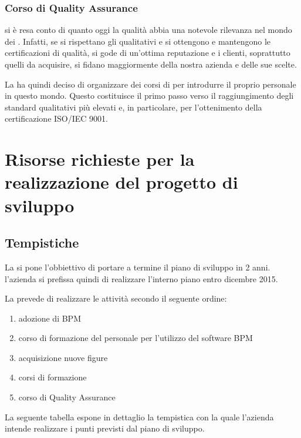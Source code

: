 
\subsubsection{Corso di Quality Assurance}
\customer si è resa conto di quanto oggi la qualità abbia una notevole rilevanza nel mondo dei . Infatti, se si rispettano gli  qualitativi e si ottengono e mantengono le certificazioni di qualità, si gode di un'ottima reputazione e i clienti, soprattutto quelli da acquisire, si fidano maggiormente della nostra azienda e delle sue scelte.

La \customer ha quindi deciso di organizzare dei corsi di  per introdurre il proprio personale in questo mondo. Questo costituisce il primo passo verso il raggiungimento degli standard qualitativi più elevati e, in particolare,  per l'ottenimento della certificazione ISO/IEC 9001.
  
  
  
  
\section{Risorse richieste per la realizzazione del progetto di sviluppo}
\subsection{Tempistiche}
La \customer si pone l'obbiettivo di portare a termine il piano di sviluppo in 2 anni. l'azienda si prefissa quindi di realizzare l'interno piano entro dicembre 2015.       
	
La \customer prevede di realizzare le attività secondo il seguente ordine:
\begin{enumerate}
\item adozione di  BPM
\item corso di formazione del personale per l'utilizzo del software BPM
\item acquisizione nuove figure
\item corsi di formazione 
\item corso di Quality Assurance
\end{enumerate}   
La seguente tabella espone in dettaglio la tempistica con la quale l'azienda intende realizzare i punti previsti dal piano di sviluppo.
     
